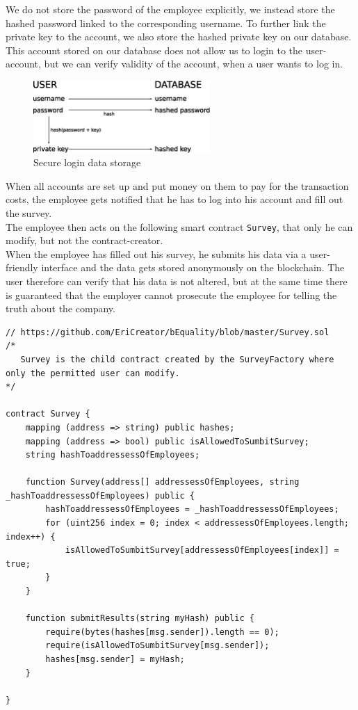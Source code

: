 We do not store the password of the employee explicitly, we instead store the hashed password linked to the corresponding username. To further link the private key to the account, we also store the hashed private key on our database.\\
This account stored on our database does not allow us to login to the user-account, but we can verify validity of the account, when a user wants to log in.
\begin{figure}[H]
	\includegraphics[width=0.6\textwidth]{Bilder/SecureLoginDataStorage-scheme.eps}
	\caption{Secure login data storage}
	\label{Secure_Login_data_storage}
\end{figure}
When all accounts are set up and put money on them to pay for the transaction costs, the employee gets notified that he has to log into his account and fill out the survey.\\
The employee then acts on the following smart contract \texttt{Survey}, that only he can modify, but not the contract-creator.\\
When the employee has filled out his survey, he submits his data via a user-friendly interface and the data gets stored anonymously on the blockchain. The user therefore can verify that his data is not altered, but at the same time there is guaranteed that the employer cannot prosecute the employee for telling the truth about the company.

\begin{lstlisting}
// https://github.com/EriCreator/bEquality/blob/master/Survey.sol
/*
   Survey is the child contract created by the SurveyFactory where only the permitted user can modify.
*/

contract Survey {
    mapping (address => string) public hashes;
    mapping (address => bool) public isAllowedToSumbitSurvey;
    string hashToaddressessOfEmployees;

    function Survey(address[] addressessOfEmployees, string _hashToaddressessOfEmployees) public {
        hashToaddressessOfEmployees = _hashToaddressessOfEmployees;
        for (uint256 index = 0; index < addressessOfEmployees.length; index++) {
            isAllowedToSumbitSurvey[addressessOfEmployees[index]] = true;
        }
    }

    function submitResults(string myHash) public {
        require(bytes(hashes[msg.sender]).length == 0);
        require(isAllowedToSumbitSurvey[msg.sender]);
        hashes[msg.sender] = myHash;
    }

}
\end{lstlisting}


